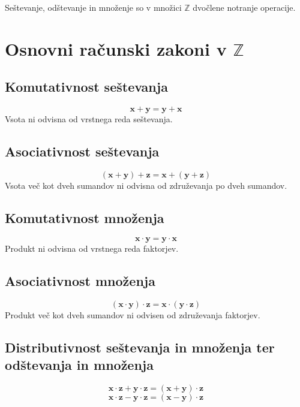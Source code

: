              
                Seštevanje, odštevanje in množenje so v množici $\mathbb{Z}$ dvočlene notranje operacije.
             
         
                
                    \section{Osnovni računski zakoni v $\mathbb{Z}$}



                    \subsection*{Komutativnost seštevanja}
                    $$ \mathbf{x+y=y+x}$$
                    Vsota ni odvisna od vrstnega reda seštevanja.
                 
            
                    \subsection*{Asociativnost seštevanja}
                    $$ \mathbf{(x+y)+z=x+(y+z)}$$
                    Vsota več kot dveh sumandov ni odvisna od združevanja po dveh sumandov.
                 
            
                    \subsection*{Komutativnost množenja}
                    $$ \mathbf{x\cdot y=y\cdot x}$$
                    Produkt ni odvisna od vrstnega reda faktorjev.
                 
            
                    \subsection*{Asociativnost množenja}
                    $$ \mathbf{(x\cdot y)\cdot z=x\cdot (y\cdot z)}$$
                    Produkt več kot dveh sumandov ni odvisen od združevanja faktorjev.
                 
                    \subsection*{Distributivnost seštevanja in množenja ter odštevanja in množenja}
                    $$ \mathbf{x\cdot z+y\cdot z = (x+y)\cdot z} $$
                    $$ \mathbf{x\cdot z-y\cdot z = (x-y)\cdot z} $$

